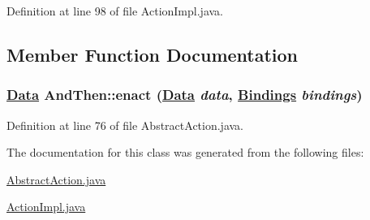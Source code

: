 Definition at line 98 of file Action\-Impl.java.

\subsection{Member Function Documentation}
\hypertarget{classAndThen_a1}{
\subsubsection[enact]{\setlength{\rightskip}{0pt plus 5cm}\hyperlink{interfaceData}{Data} And\-Then::enact (\hyperlink{interfaceData}{Data} {\em data}, \hyperlink{interfaceBindings}{Bindings} {\em bindings})}}
\label{classAndThen_a1}




Definition at line 76 of file Abstract\-Action.java.

The documentation for this class was generated from the following files:\begin{CompactItemize}
\item 
\hyperlink{AbstractAction_8java-source}{Abstract\-Action.java}\item 
\hyperlink{ActionImpl_8java-source}{Action\-Impl.java}\end{CompactItemize}
